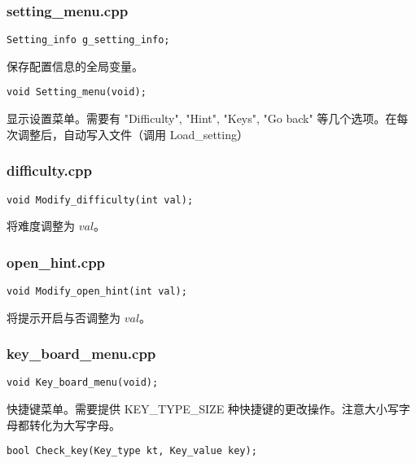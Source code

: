 \documentclass{article}
\begin{document}
    \subsubsection{setting\_menu.cpp}

    \begin{lstlisting}
Setting_info g_setting_info;
    \end{lstlisting}

    保存配置信息的全局变量。

    \begin{lstlisting}
void Setting_menu(void);
    \end{lstlisting}

    显示设置菜单。需要有 "Difficulty", "Hint", "Keys", "Go back" 等几个选项。在每次调整后，自动写入文件（调用 Load\_setting）

    \subsubsection{difficulty.cpp}

    \begin{lstlisting}
void Modify_difficulty(int val);
    \end{lstlisting}

    将难度调整为 $val$。

    \subsubsection{open\_hint.cpp}

    \begin{lstlisting}
void Modify_open_hint(int val);
    \end{lstlisting}

    将提示开启与否调整为 $val$。

    \subsubsection{key\_board\_menu.cpp}

    \begin{lstlisting}
void Key_board_menu(void);
    \end{lstlisting}

    快捷键菜单。需要提供 KEY\_TYPE\_SIZE 种快捷键的更改操作。注意大小写字母都转化为大写字母。

    \begin{lstlisting}
bool Check_key(Key_type kt, Key_value key);
    \end{lstlisting}
\end{document}
